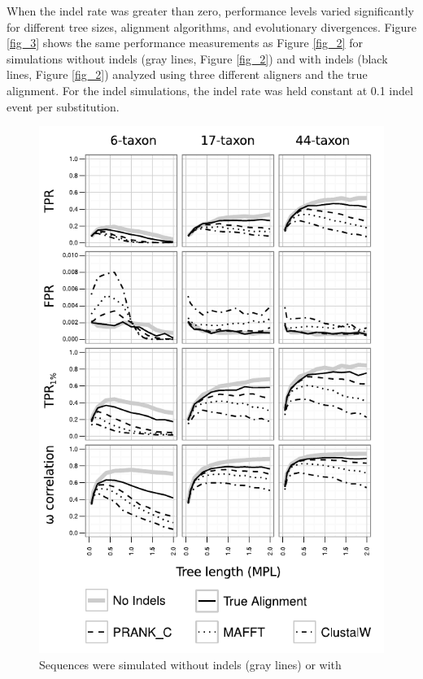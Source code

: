 \documentclass{article}
\begin{document}
When the indel rate was greater than zero, performance levels varied
significantly for different tree sizes, alignment algorithms, and
evolutionary divergences. Figure \ref{fig_3} shows the same
performance measurements as Figure \ref{fig_2} for simulations without
indels (gray lines, Figure \ref{fig_2}) and with indels (black lines,
Figure \ref{fig_2}) analyzed using three different aligners and the
true alignment. For the indel simulations, the indel rate was held
constant at 0.1 indel event per substitution.
\begin{figure}[t]
\begin{center}
\includegraphics[scale=1.25]{fig3.pdf}
\end{center}
\caption{Sequences were simulated without indels (gray lines) or with
}
\end{figure}
\end{document}
